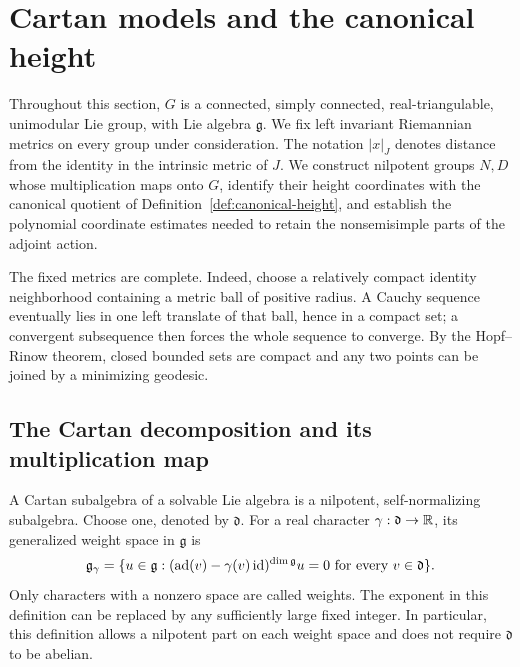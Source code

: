 \section{Cartan models and the canonical height}
\label{sec:models}

Throughout this section, $G$ is a connected, simply connected,
real-triangulable, unimodular Lie group, with Lie algebra $\mathfrak g$.
We fix left invariant Riemannian metrics on every group under consideration.
The notation $|x|_J$ denotes distance from the identity in the intrinsic
metric of $J$. We construct nilpotent groups $N,D$ whose multiplication
maps onto $G$, identify their height coordinates with the canonical quotient
of Definition~\ref{def:canonical-height}, and establish the polynomial
coordinate estimates needed to retain the nonsemisimple parts of the
adjoint action.

The fixed metrics are complete. Indeed, choose a relatively compact identity
neighborhood containing a metric ball of positive radius. A Cauchy
sequence eventually lies in one left translate of that ball, hence in
a compact set; a convergent subsequence then forces the whole sequence
to converge. By the Hopf--Rinow theorem, closed bounded sets are compact
and any two points can be joined by a minimizing geodesic.

\subsection{The Cartan decomposition and its multiplication map}

A Cartan subalgebra of a solvable Lie algebra is a nilpotent,
self-normalizing subalgebra.  Choose one, denoted by $\mathfrak d$.
For a real character $\gamma:\mathfrak d\to\mathbb R$, its generalized weight
space in $\mathfrak g$ is
\[
 \mathfrak g_\gamma
 =\{u\in\mathfrak g:
   (\operatorname{ad}(v)-\gamma(v)\operatorname{id})^{\dim\mathfrak g}u=0
   \text{ for every }v\in\mathfrak d\}.
\]
Only characters with a nonzero space are called weights.  The exponent
in this definition can be replaced by any sufficiently large fixed integer.
In particular, this definition allows a nilpotent part on each weight
space and does not require $\mathfrak d$ to be abelian.

